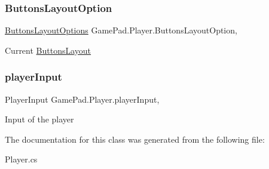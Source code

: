 \subsubsection{\texorpdfstring{ButtonsLayoutOption}{ButtonsLayoutOption}}
{\footnotesize\ttfamily \mbox{\hyperlink{namespace_game_pad_ad65f651e47321df25402246e8df26c37}{Buttons\+Layout\+Options}} Game\+Pad.\+Player.\+Buttons\+Layout\+Option\hspace{0.3cm}{\ttfamily [get]}, {\ttfamily [set]}}



Current \mbox{\hyperlink{class_game_pad_1_1_buttons_layout}{Buttons\+Layout}} 

\mbox{\label{class_game_pad_1_1_player_a1a82f9fc7b2d4e62379383f26173b51e}} 
\subsubsection{\texorpdfstring{playerInput}{playerInput}}
{\footnotesize\ttfamily Player\+Input Game\+Pad.\+Player.\+player\+Input\hspace{0.3cm}{\ttfamily [get]}, {\ttfamily [set]}}



Input of the player 



The documentation for this class was generated from the following file\+:\begin{DoxyCompactItemize}
\item 
Player.\+cs\end{DoxyCompactItemize}
